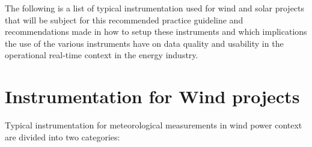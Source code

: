 The following is a list of typical instrumentation used for wind and solar projects that will be subject for this recommended practice guideline and recommendations made in how to setup these instruments and which implications the use of the various instruments have on data quality and usability in the operational real-time context in the energy industry.

\section{Instrumentation for Wind projects}\label{sec:wind_instrumentation}

Typical instrumentation for meteorological measurements in wind power context are divided into two categories: 

